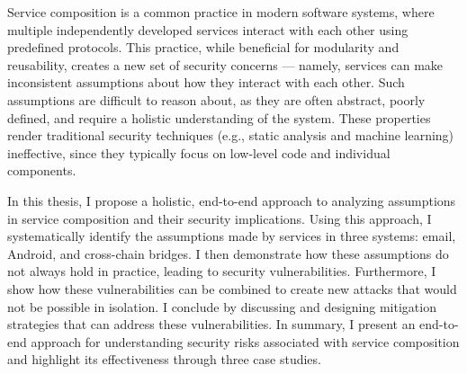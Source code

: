 
\begin{dissertationabstract} 
Service composition is a common practice in modern software systems, where multiple independently developed services interact with each other using predefined protocols. This practice, while beneficial for modularity and reusability, creates a new set of security concerns --- namely, services can make inconsistent assumptions about how they interact with each other. Such assumptions are difficult to reason about, as they are often abstract, poorly defined, and require a holistic understanding of the system. These properties render traditional security techniques (e.g., static analysis and machine learning) ineffective, since they typically focus on low-level code and individual components.

In this thesis, I propose a holistic, end-to-end approach to analyzing assumptions in service composition and their security implications. Using this approach, I systematically identify the assumptions made by services in three systems: email, Android, and cross-chain bridges. I then demonstrate how these assumptions do not always hold in practice, leading to security vulnerabilities. Furthermore, I show how these vulnerabilities can be combined to create new attacks that would not be possible in isolation. I conclude by discussing and designing mitigation strategies that can address these vulnerabilities. In summary, I present an end-to-end approach for understanding security risks associated with service composition and highlight its effectiveness through three case studies.




\end{dissertationabstract}